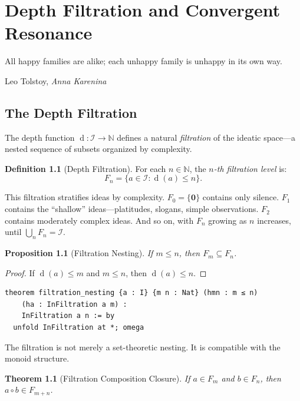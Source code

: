 \documentclass[11pt,openany]{book}
\theoremstyle{definition}
\newtheorem{definition}[axiom]{Definition}
\theoremstyle{plain}
\newtheorem{theorem}[axiom]{Theorem}
\newtheorem{proposition}[axiom]{Proposition}
\theoremstyle{remark}
\newcommand{\IS}{\mathcal{I}}               %
\newcommand{\compose}{\circ}                 %
\newcommand{\void}{\mathbf{0}}              %
\newcommand{\depth}{\operatorname{d}}       %
\begin{document}
\chapter{Depth Filtration and Convergent Resonance}
\label{ch:filtration-convergence}

\epigraph{All happy families are alike; each unhappy family is unhappy in its own way.}{Leo Tolstoy, \textit{Anna Karenina}}

\section{The Depth Filtration}

The depth function $\depth : \IS \to \mathbb{N}$ defines a natural \emph{filtration} of the ideatic space---a nested sequence of subsets organized by complexity.

\begin{definition}[Depth Filtration]
For each $n \in \mathbb{N}$, the \emph{$n$-th filtration level} is:
\[
F_n = \{a \in \IS : \depth(a) \leq n\}.
\]
\end{definition}

This filtration stratifies ideas by complexity. $F_0 = \{\void\}$ contains only silence. $F_1$ contains the ``shallow'' ideas---platitudes, slogans, simple observations. $F_2$ contains moderately complex ideas. And so on, with $F_n$ growing as $n$ increases, until $\bigcup_n F_n = \IS$.

\begin{proposition}[Filtration Nesting]
If $m \leq n$, then $F_m \subseteq F_n$.
\end{proposition}

\begin{proof}
If $\depth(a) \leq m$ and $m \leq n$, then $\depth(a) \leq n$.
\end{proof}

\begin{lstlisting}[language=Lean4]
theorem filtration_nesting {a : I} {m n : Nat} (hmn : m ≤ n)
    (ha : InFiltration a m) :
    InFiltration a n := by
  unfold InFiltration at *; omega
\end{lstlisting}

The filtration is not merely a set-theoretic nesting. It is compatible with the monoid structure.

\begin{theorem}[Filtration Composition Closure]
\label{thm:filtration-compose}
If $a \in F_m$ and $b \in F_n$, then $a \compose b \in F_{m+n}$.
\end{theorem}
\end{document}
